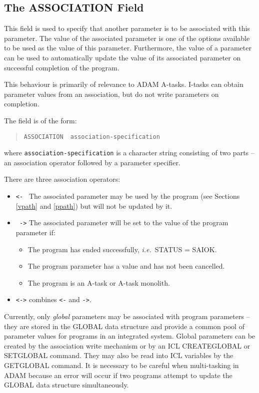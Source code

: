 \documentclass[twoside,11pt]{article}
\newcommand{\xlabel}[1]{}
\renewcommand{\_}{\texttt{\symbol{95}}}
\begin{document}
\subsection{The ASSOCIATION Field
\xlabel{the_association_field}\label{association}}

This field is used to specify that another parameter is to be associated
with this parameter.
The value of the associated parameter is one of the options available to be
used as the value of this parameter.
Furthermore, the value of a parameter can be used to automatically update
the value of its associated parameter on successful completion of the
program.

This behaviour is primarily of relevance to ADAM A-tasks. I-tasks
can obtain parameter values from an association, but do not write
parameters on completion.

The field is of the form:
\begin{quote} \begin{verbatim}
ASSOCIATION  association-specification
\end{verbatim} \end{quote}
where \texttt{association-specification} is a character string consisting of two
parts -- an association operator followed by a parameter specifier.

There are three association operators:
\begin{itemize}
\item \texttt{<- } The associated parameter may be used by the program (see
Sections \ref{vpath} and \ref{ppath}) but will not be updated by it.
\item \texttt{ ->} The associated parameter will be set to the value of the
program parameter if:
\begin{itemize}
\item The program has ended successfully, {\em i.e.}\ STATUS = SAI\_\_OK.
\item The program parameter has a value and has not been cancelled.
\item The program is an A-task or A-task monolith.
\end{itemize}
\item \texttt{<->} combines \texttt{<-} and \texttt{->}.
\end{itemize}

Currently, only {\em global} parameters may be associated with program
parameters  -- they are stored in the GLOBAL data structure and provide a
common pool of parameter values for programs in an integrated system.
Global parameters can be created by the association write
mechanism or by an ICL CREATEGLOBAL or SETGLOBAL command. They may also be
read into ICL variables by the GETGLOBAL command.
It is necessary to be careful when multi-tasking in ADAM because
an error will occur if two programs attempt to update the GLOBAL data
structure simultaneously.
\end{document}
